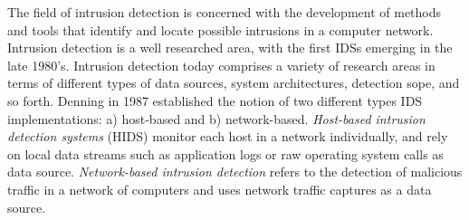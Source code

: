 The field of intrusion detection is concerned with the development of methods and tools that identify and locate possible intrusions in a computer network. %
Intrusion detection is a well researched area, with the first IDSs emerging in the late 1980's. Intrusion detection today comprises a variety of research areas in terms of different types of data sources, system architectures, detection sope, and so forth. Denning \cite{denning1987intrusion} in 1987 established the notion of two different types IDS implementations: a) host-based and b) network-based. 
\textit{Host-based intrusion detection systems} (HIDS) monitor each host in a network individually, and rely on local data streams such as application logs or raw operating system calls as  data source. \textit{Network-based intrusion detection} refers to the detection of malicious traffic in a network of computers and uses network traffic captures as a data source. %




